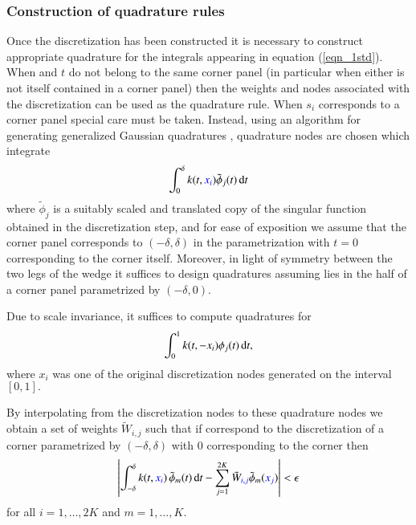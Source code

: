 \subsubsection{Construction of quadrature rules}

Once the discretization has been constructed it is necessary to construct appropriate quadrature for the integrals appearing in equation (\ref{eqn_1std}). When  and $t$ do not belong to the same corner panel (in particular when either is not itself contained in a corner panel) then the weights and nodes associated with the discretization can be used as the quadrature rule. When $s_i$ corresponds to a corner panel special care must be taken. Instead, using an algorithm for generating generalized Gaussian quadratures \cite{bremer2010}, quadrature nodes are chosen which integrate
\begin{align}
\int_{0}^\delta k(t,{\color{blue} x_i}) \tilde{\phi}_j(t)\,{\rm d}t
\end{align} 
where $\tilde{\phi}_j$ is a suitably scaled and translated copy of the singular function obtained in the discretization step, and for ease of exposition we assume that the corner panel corresponds to $(-\delta,\delta)$ in the parametrization with $t=0$ corresponding to the corner itself. Moreover, in light of symmetry between the two legs of the wedge it suffices to design quadratures assuming   lies in the half of a corner panel parametrized by $(-\delta,0).$
\begin{remark}
Due to scale invariance, it suffices to compute quadratures for 
\begin{align}
\int_{0}^1 k(t,-x_i) {\phi}_j(t)\,{\rm d}t,
\end{align} 
where $x_i$ was one of the original discretization nodes generated on the interval $[0,1].$
\end{remark}
\begin{remark}
By interpolating from the discretization nodes to these quadrature nodes we obtain a set of weights $\tilde{W}_{i,j}$ such that if  correspond to the discretization of a corner parametrized by $(-\delta,\delta)$ with $0$ corresponding to the corner then
\begin{align}
\left| \int_{-\delta}^\delta k(t,{\color{blue} x_i}) \, \tilde{\phi}_m(t)\,{\rm d}t - \sum_{j=1}^{2K} \tilde{W}_{{\color{blue} i,j}} \tilde{\phi}_{m}({\color{blue} x_j}) \right| < \epsilon
\end{align}
for all $i=1,\dots,2K$ and $m=1,\dots,K.$
\end{remark}

